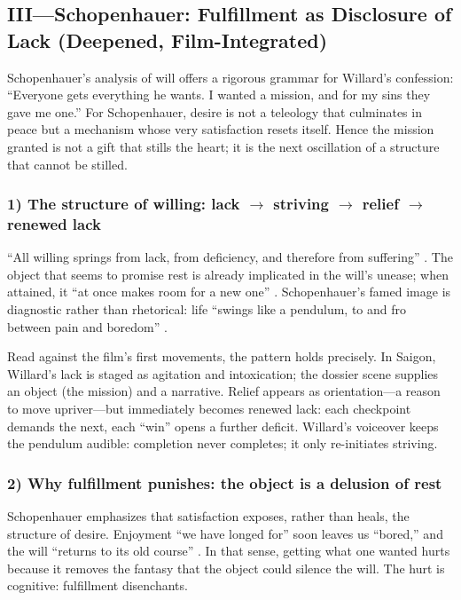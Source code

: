 \subsection*{III—Schopenhauer: Fulfillment as Disclosure of Lack (Deepened, Film-Integrated)}
\label{ssec:iii-schopenhauer}
Schopenhauer's analysis of will offers a rigorous grammar for Willard's confession:
``Everyone gets everything he wants. I wanted a mission, and for my sins they gave me one.''
For Schopenhauer, desire is not a teleology that culminates in peace but a mechanism whose
very satisfaction resets itself. Hence the mission granted is not a gift that stills the heart;
it is the next oscillation of a structure that cannot be stilled.

\subsubsection*{1) The structure of willing: lack $\rightarrow$ striving
	$\rightarrow$ relief $\rightarrow$ renewed lack}

``All willing springs from lack, from deficiency, and therefore from suffering''
\parencite[p.~196]{SchopenhauerWWR1969}. The object that seems to promise rest is already
implicated in the will's unease; when attained, it ``at once makes room for a new one''
\parencite[p.~319]{SchopenhauerWWR1969}. Schopenhauer's famed image is diagnostic rather
than rhetorical: life ``swings like a pendulum, to and fro between pain and boredom''
\parencite[p.~312]{SchopenhauerWWR1969}.

Read against the film's first movements, the pattern holds precisely. In Saigon, Willard's
lack is staged as agitation and intoxication; the dossier scene supplies an object (the mission)
and a narrative. Relief appears as orientation—a reason to move upriver—but immediately becomes
renewed lack: each checkpoint demands the next, each ``win'' opens a further deficit.
Willard's voiceover keeps the pendulum audible: completion never completes; it only
re-initiates striving.

\subsubsection*{2) Why fulfillment punishes: the object is a delusion of rest}

Schopenhauer emphasizes that satisfaction exposes, rather than heals, the structure of desire.
Enjoyment ``we have longed for'' soon leaves us ``bored,'' and the will ``returns to its old
course'' \parencite[p.~319]{SchopenhauerWWR1969}. In that sense, getting what one wanted hurts
because it removes the fantasy that the object could silence the will. The hurt is cognitive:
fulfillment disenchants.

